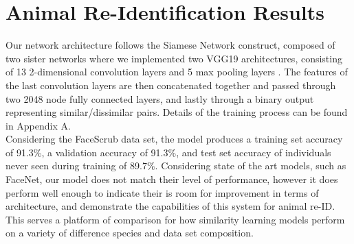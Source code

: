 \documentclass[11pt]{article}
\begin{document}
\section*{Animal Re-Identification Results}

Our network architecture follows the Siamese Network construct, composed of two sister networks where we implemented two VGG19 architectures, consisting of 13 2-dimensional convolution layers and 5 max pooling layers \cite{simonyan2014very}. The features of the last convolution layers are then concatenated together and passed through two 2048 node fully connected layers, and lastly through a binary output representing similar/dissimilar pairs. Details of the training process can be found in Appendix A.
\newline
\\
Considering the FaceScrub data set, the model produces a training set accuracy of 91.3\%, a validation accuracy of 91.3\%, and test set accuracy of individuals never seen during training of 89.7\%. Considering state of the art models, such as FaceNet, our model does not match their level of performance, however it does perform well enough to indicate their is room for improvement in terms of architecture, and demonstrate the capabilities of this system for animal re-ID. This serves a platform of comparison for how similarity learning models perform on a variety of difference species and data set composition. 
\newline
\end{document}
